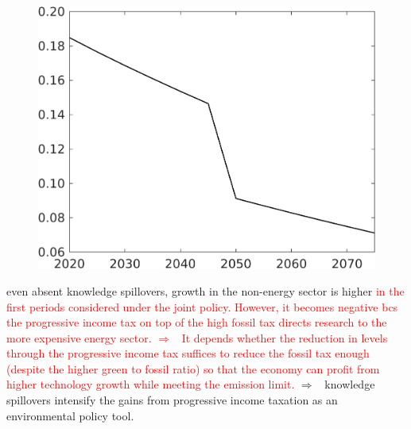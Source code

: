 \documentclass[12pt]{article}
\newcommand{\ar}{$\Rightarrow$ \ }
\newcommand{\tr}[1]{\textcolor{red}{#1}}
\begin{document}
\begin{figure}[h!!]
\begin{minipage}[]{0.32\textwidth}
	\end{minipage}		
	\begin{minipage}[]{0.32\textwidth}
		\includegraphics[width=1\textwidth]{../../codding_model/own_basedOnFried/optimalPol_010922_revision/figures/all_13Sept22/CompTaufPER_bytaul_Reg0_EY_spillover0_nsk0_xgr0_knspil1_sep1_LFlimit1_emsbase0_countec0_GovRev0_etaa0.79_lgd0.png}
	\end{minipage}	
\end{figure}
 even absent knowledge spillovers, growth in the non-energy sector is higher \tr{in the first periods considered under the joint policy. However, it becomes negative bcs the progressive income tax on top of the high fossil tax directs research to the more expensive energy sector. \ar It depends whether the reduction in levels through the progressive income tax suffices to reduce the fossil tax enough (despite the higher green to fossil ratio) so that the economy can profit from higher technology growth while meeting the emission limit.}
 \ar knowledge spillovers intensify the gains from progressive income taxation as an environmental policy tool. 
 
\end{document}
